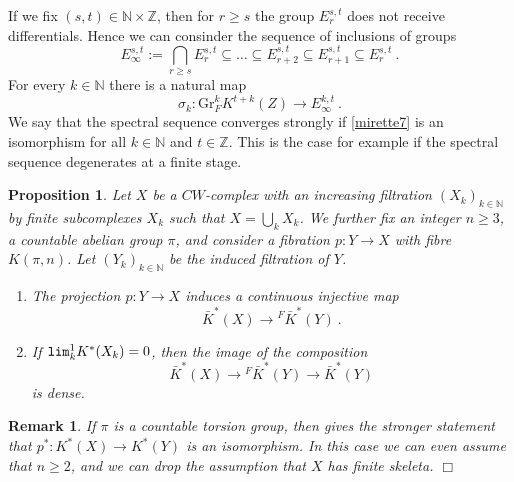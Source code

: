 \documentclass[12pt]{article}
\newtheorem{prop}[theorem]{Proposition}
\newtheorem{fact}[theorem]{Fact}
\newtheorem{rem}[theorem]{Remark}
\newcommand{\Gr}{\mathrm{Gr}}
\def\hB{\hspace*{\fill}$\Box$ \newline\noindent}
\newcommand{\nat}{{\mathbb{N}}}
\newcommand{\Z}{{\mathbb{Z}}}
\renewcommand{\lim}{{\tt lim}}
\begin{document}
If we fix $(s,t) \in \nat\times \Z$, then for $r\ge s$ the group $E_{r}^{s,t}$ does not receive differentials. Hence we can consinder the sequence of inclusions of groups $$E_{\infty}^{s,t}:=\bigcap_{r\ge s} E_{r}^{s,t}\subseteq \dots\subseteq E_{r+2}^{s,t}\subseteq E_{r+1}^{s,t}\subseteq E_{r}^{s,t}\ .$$
For every $k\in \nat$ there is a natural map
\begin{equation}\label{mirette7}\sigma_{k}:\Gr_{F}^{k}K^{t+k}(Z)\to E_{\infty}^{k,t}\ . \end{equation}
We say that the spectral sequence converges strongly if
\eqref{mirette7} is an isomorphism for all $k\in \nat$ and $t\in \Z$. 
This is the case for example if the spectral sequence degenerates at a finite stage.

 



 
\begin{prop}\label{pinv1} Let $X$ be a $CW$-complex with an increasing filtration $(X_{k})_{k\in \nat}$ by finite subcomplexes $X_{k}$ such that $X=\bigcup_{k}X_{k}$.  We further fix an integer $n\ge 3$, a countable abelian group $\pi$, and consider a fibration
$p:Y\to X$ with fibre $K(\pi,n)$. Let $(Y_{k})_{k\in \nat}$ be the induced filtration of $Y$.  
\begin{enumerate}
\item
The projection
$p:Y\to X$ induces a continuous  injective   map \begin{equation}\label{barp111} \bar K^{*}(X) \to {}^{F} \bar K^{*}(Y)\ .\end{equation}
\item If   $\lim^{1}_{k}K^{*}(X_{k})=0$,     
then the image  of the composition \begin{equation}\label{barp1111}\bar K^{*}(X)\to {}^{F}\bar K^{*}(Y)\to \bar K^{*}(Y)\end{equation}  is dense.
\end{enumerate}
 \end{prop}
\begin{rem}{\rm If $\pi$ is a countable torsion group, then \cite[Prop. 4.7]{MR0231369} gives the stronger statement that
$p^{*}:K^{*}(X)\to K^{*}(Y)$ is an isomorphism. In this case we can even assume that $n\ge 2$, and we can drop the assumption that $X$ has finite skeleta.} \hB
\end{rem}
\end{document}
